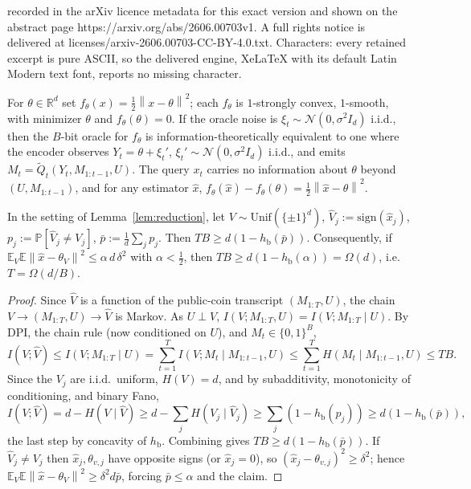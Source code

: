 \documentclass[10pt,a4paper]{amsart}
\newcommand{\E}{\mathbb{E}}
\newcommand{\Ncal}{\mathcal{N}}
\newcommand{\Prob}{\mathbb{P}}
\newcommand{\R}{\mathbb{R}}
\newcommand{\Unif}{\mathrm{Unif}}
\newcommand{\hb}{h_{\mathrm{b}}}
\newcommand{\norm}[1]{\left\lVert #1 \right\rVert}
\newcommand{\sign}{\mathrm{sign}}
\begin{document}
recorded in the arXiv licence metadata for this exact version and shown on the abstract page https://arxiv.org/abs/2606.00703v1. A full rights notice is delivered at licenses/arxiv-2606.00703-CC-BY-4.0.txt. Characters: every retained excerpt is pure ASCII, so the delivered engine, XeLaTeX with its default Latin Modern text font, reports no missing character.
\begin{lemma}
\label{lem:reduction}
For $\theta\in\R^d$ set $f_\theta(x)=\tfrac12\norm{x-\theta}^2$; each $f_\theta$ is $1$-strongly convex,
$1$-smooth, with minimizer $\theta$ and $f_\theta(\theta)=0$. If the oracle noise is
$\xi_t\sim\Ncal(0,\sigma^2 I_d)$ i.i.d., then the $B$-bit oracle for $f_\theta$ is
information-theoretically equivalent to one where the encoder observes $Y_t=\theta+\xi_t'$,
$\xi_t'\sim\Ncal(0,\sigma^2 I_d)$ i.i.d., and emits $M_t=\tilde Q_t(Y_t,M_{1:t-1},U)$. The query $x_t$
carries no information about $\theta$ beyond $(U,M_{1:t-1})$, and for any estimator $\hat x$,
$f_\theta(\hat x)-f_\theta(\theta)=\tfrac12\norm{\hat x-\theta}^2$.
\end{lemma}

\begin{theorem}
\label{thm:comm}
In the setting of Lemma~\ref{lem:reduction}, let $V\sim\Unif(\{\pm1\}^d)$, $\hat V_j:=\sign(\hat x_j)$,
$p_j:=\Prob[\hat V_j\neq V_j]$, $\bar p:=\tfrac1d\sum_j p_j$. Then $TB\ge d(1-\hb(\bar p))$.
Consequently, if $\E_V\E\norm{\hat x-\theta_V}^2\le\alpha\,d\,\delta^2$ with $\alpha<\tfrac12$, then
$TB\ge d(1-\hb(\alpha))=\Omega(d)$, i.e.\ $T=\Omega(d/B)$.
\end{theorem}

\begin{proof}
Since $\hat V$ is a function of the public-coin transcript $(M_{1:T},U)$, the chain
$V\to(M_{1:T},U)\to\hat V$ is Markov. As
$U\perp V$, $I(V;M_{1:T},U)=I(V;M_{1:T}\mid U)$. By DPI, the chain rule (now conditioned on $U$), and
$M_t\in\{0,1\}^B$,
\begin{equation}
I(V;\hat V)\le I(V;M_{1:T}\mid U)=\sum_{t=1}^T I(V;M_t\mid M_{1:t-1},U)\le\sum_{t=1}^T H(M_t\mid M_{1:t-1},U)\le TB.
\label{eq:upperMI}
\end{equation}
Since the $V_j$ are i.i.d.\ uniform, $H(V)=d$, and by subadditivity, monotonicity of conditioning, and
binary Fano,
\begin{equation}
I(V;\hat V)=d-H(V\mid\hat V)\ge d-\sum_j H(V_j\mid\hat V_j)\ge\sum_j(1-\hb(p_j))\ge d(1-\hb(\bar p)),
\label{eq:lowerMI}
\end{equation}
the last step by concavity of $\hb$. Combining gives $TB\ge d(1-\hb(\bar p))$. If $\hat V_j\neq V_j$ then
$\hat x_j,\theta_{v,j}$ have opposite signs (or $\hat x_j=0$), so $(\hat x_j-\theta_{v,j})^2\ge\delta^2$;
hence $\E_V\E\norm{\hat x-\theta_V}^2\ge\delta^2 d\bar p$, forcing $\bar p\le\alpha$ and the claim.
\end{proof}
\end{document}
